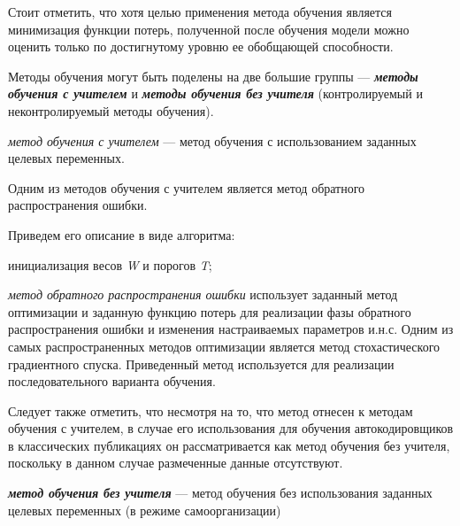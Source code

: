 Стоит отметить, что хотя целью применения метода обучения является минимизация функции потерь,  полученной после обучения модели можно оценить только по достигнутому уровню ее обобщающей способности.

Методы обучения могут быть поделены на две большие группы --- \textit{\textbf{методы обучения с учителем}} и \textit{\textbf{методы обучения без учителя}} (контролируемый и неконтролируемый методы обучения).

\textit{метод обучения с учителем} --- метод обучения с использованием заданных целевых переменных.

Одним из методов обучения с учителем является метод обратного распространения ошибки.

Приведем его описание в виде алгоритма:

\begin{algorithm}[H]
	инициализация весов \textit{W} и порогов \textit{T};\\
\end{algorithm}

\textit{метод обратного распространения ошибки} использует заданный метод оптимизации и заданную функцию потерь для реализации фазы обратного распространения ошибки и изменения настраиваемых параметров и.н.с. Одним из самых распространенных методов оптимизации является метод стохастического градиентного спуска. Приведенный метод используется для реализации последовательного варианта обучения.

Следует также отметить, что несмотря на то, что метод отнесен к методам обучения с учителем, в случае
его использования для обучения автокодировщиков в классических публикациях он рассматривается как
метод обучения без учителя, поскольку в данном случае размеченные данные отсутствуют.

\textbf{\textit{метод обучения без учителя}} --- метод обучения без использования заданных целевых переменных (в режиме самоорганизации)

